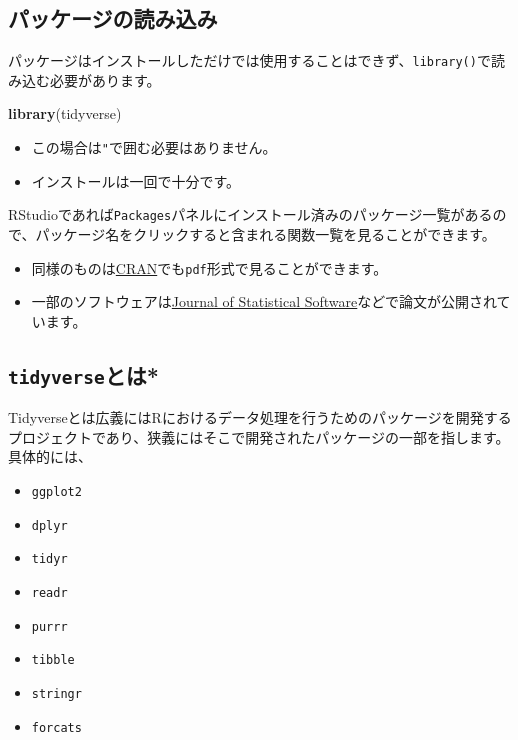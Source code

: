 \documentclass[]{bxjsreport}
\newenvironment{Shaded}{\begin{snugshade}}{\end{snugshade}}
\newcommand{\KeywordTok}[1]{\textcolor[rgb]{0.13,0.29,0.53}{\textbf{#1}}}
\newcommand{\NormalTok}[1]{#1}
\providecommand{\tightlist}{%
  \setlength{\itemsep}{0pt}\setlength{\parskip}{0pt}}
\let\asdf\section
\renewcommand{\section}{\chapter}
\let\asdff\subsection
\renewcommand{\subsection}{\asdf}
\renewcommand{\subsubsection}{\asdff}
\begin{document}
\hypertarget{ux30d1ux30c3ux30b1ux30fcux30b8ux306eux8aadux307fux8fbcux307f}{%
\subsubsection{パッケージの読み込み}\label{ux30d1ux30c3ux30b1ux30fcux30b8ux306eux8aadux307fux8fbcux307f}}

パッケージはインストールしただけでは使用することはできず、\texttt{library()}で読み込む必要があります。

\begin{Shaded}
\begin{Highlighting}[]
\KeywordTok{library}\NormalTok{(tidyverse)}
\end{Highlighting}
\end{Shaded}

\begin{itemize}
\tightlist
\item
  この場合は\texttt{"}で囲む必要はありません。
\item
  インストールは一回で十分です。
\end{itemize}

RStudioであれば\texttt{Packages}パネルにインストール済みのパッケージ一覧があるので、パッケージ名をクリックすると含まれる関数一覧を見ることができます。

\begin{itemize}
\tightlist
\item
  同様のものは\href{https://cran.r-project.org/}{CRAN}でも\texttt{pdf}形式で見ることができます。
\item
  一部のソフトウェアは\href{https://www.jstatsoft.org/index}{Journal of Statistical Software}などで論文が公開されています。
\end{itemize}

\hypertarget{tidyverseux3068ux306f}{%
\subsubsection{\texorpdfstring{\texttt{tidyverse}とは*}{tidyverseとは*}}\label{tidyverseux3068ux306f}}

Tidyverseとは広義にはRにおけるデータ処理を行うためのパッケージを開発するプロジェクトであり、狭義にはそこで開発されたパッケージの一部を指します。
具体的には、

\begin{itemize}
\tightlist
\item
  \texttt{ggplot2}
\item
  \texttt{dplyr}
\item
  \texttt{tidyr}
\item
  \texttt{readr}
\item
  \texttt{purrr}
\item
  \texttt{tibble}
\item
  \texttt{stringr}
\item
  \texttt{forcats}
\end{itemize}
\end{document}
